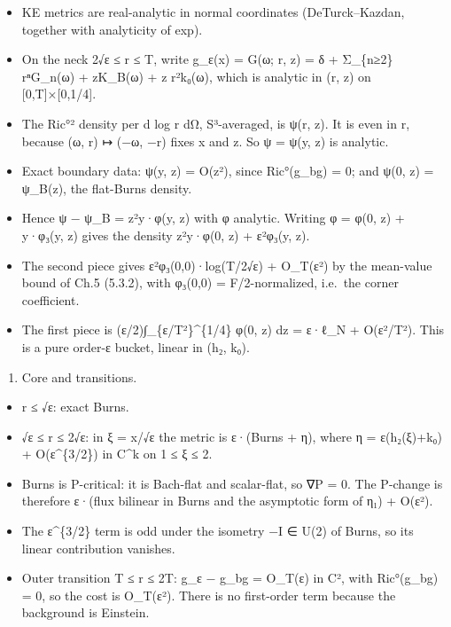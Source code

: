 \documentclass[
  10pt,
]{report}
\providecommand{\tightlist}{%
  \setlength{\itemsep}{0pt}\setlength{\parskip}{0pt}}
\begin{document}
\begin{itemize}
\tightlist
\item
  KE metrics are real-analytic in normal coordinates (DeTurck--Kazdan,
  together with analyticity of exp).
\item
  On the neck 2√ε ≤ r ≤ T, write g\_ε(x) = G(ω; r, z) = δ + Σ\_\{n≥2\}
  rⁿG\_n(ω) + zK\_B(ω) + z r²k₀(ω), which is analytic in (r, z) on
  {[}0,T{]}×{[}0,1/4{]}.
\item
  The \textbar Ric°\textbar² density per d log r dΩ, S³-averaged, is
  ψ(r, z). It is even in r, because (ω, r) ↦ (−ω, −r) fixes x and z. So
  ψ = ψ(y, z) is analytic.
\item
  Exact boundary data: ψ(y, z) = O(z²), since Ric°(g\_bg) = 0; and ψ(0,
  z) = ψ\_B(z), the flat-Burns density.
\item
  Hence ψ − ψ\_B = z²y·φ(y, z) with φ analytic. Writing φ = φ(0, z) +
  y·φ₃(y, z) gives the density z²y·φ(0, z) + ε²φ₃(y, z).
\item
  The second piece gives ε²φ₃(0,0)·log(T/2√ε) + O\_T(ε²) by the
  mean-value bound of Ch.5 (5.3.2), with φ₃(0,0) = F/2-normalized,
  i.e.~the corner coefficient.
\item
  The first piece is (ε/2)∫\_\{ε/T²\}\^{}\{1/4\} φ(0, z) dz = ε·ℓ\_N +
  O(ε²/T²). This is a pure order-ε bucket, linear in (h₂, k₀).
\end{itemize}

\begin{enumerate}
\def\labelenumi{(\Alph{enumi})}
\setcounter{enumi}{1}
\tightlist
\item
  Core and transitions.
\end{enumerate}

\begin{itemize}
\tightlist
\item
  r ≤ √ε: exact Burns.
\item
  √ε ≤ r ≤ 2√ε: in ξ = x/√ε the metric is ε·(Burns + η), where η =
  ε(h₂(ξ)+k₀) + O(ε\^{}\{3/2\}) in C\^{}k on 1 ≤ \textbar ξ\textbar{} ≤
  2.
\item
  Burns is P-critical: it is Bach-flat and scalar-flat, so ∇P = 0. The
  P-change is therefore ε·(flux bilinear in Burns and the asymptotic
  form of η₁) + O(ε²).
\item
  The ε\^{}\{3/2\} term is odd under the isometry −I ∈ U(2) of Burns, so
  its linear contribution vanishes.
\item
  Outer transition T ≤ r ≤ 2T: g\_ε − g\_bg = O\_T(ε) in C², with
  Ric°(g\_bg) = 0, so the cost is O\_T(ε²). There is no first-order term
  because the background is Einstein.
\end{itemize}
\end{document}
